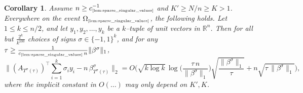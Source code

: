 \documentclass[11pt]{amsart}
\newtheorem{corollary}[theorem]{Corollary}
\theoremstyle{definition}
\theoremstyle{plain}
\newcommand{\R}{\mathbb{R}}
\def\R{{\mathbb R}}
\begin{document}
\begin{corollary}\label{cor:approxcor}
Assume $n\geq c_{\text{\tiny\ref{lem:sparse_singular_values}}}^{-1}$
and
$K'\geq N/n\geq K>1$.
Everywhere on the event
$\Omega_{\text{\tiny\ref{lem:sparse_singular_values}}}$,
the following holds.
Let
$1\leq k\leq n/2$, and let
$y_1,y_2,\dots,y_k$ be a $k$--tuple of unit vectors in $\R^n$.
Then for all but $\frac{2^k}{k^{100}}$
choices of signs $\sigma\in\{-1,1\}^k$,
and for any $\tau\geq \frac{1}{c_{\text{\tiny\ref{lem:sparse_singular_values}}}\,n}
\|\beta^\sigma\|_1$,
$$
\Big\|(A_{T^\sigma(\tau)})^\top \sum_{i=1}^k \sigma_i y_i 
-n\,\beta_{T^\sigma(\tau)}^\sigma
\Big\|_2
=
  O
  \bigg(\sqrt{k\log k}\,\log\Big(\frac{\tau\,n}{\|\beta^\sigma\|_1}\Big) \sqrt{\frac{\|\beta^\sigma\|_1}{\tau}}
  +n \sqrt{\tau\,\|\beta^\sigma\|_1}\bigg),
$$
where the implicit constant in $O(\dots)$ may only depend on $K',K$.
\end{corollary}
\end{document}

